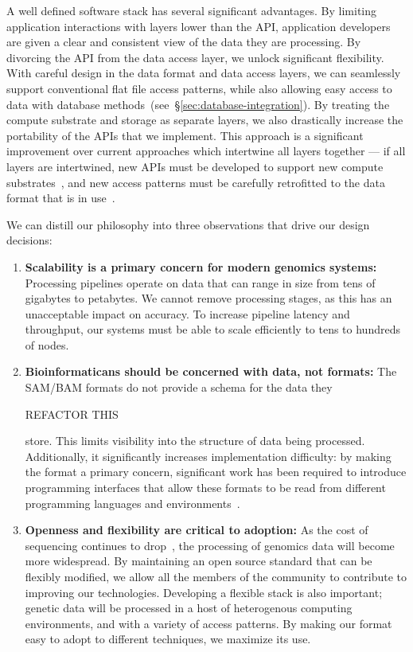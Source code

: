 \documentclass[10pt,twocolumn]{article}
\theoremstyle{plain}
\begin{document}
A well defined software stack has several significant advantages. By limiting application interactions with layers lower than the API,
application developers are given a clear and consistent view of the data they are processing. By divorcing the API from the data
access layer, we unlock significant flexibility. With careful design in the data format and data access layers, we can seamlessly
support conventional flat file access patterns, while also allowing easy access to data with database
methods~(see~\S\ref{sec:database-integration}). By treating the compute substrate and storage as separate layers, we also
drastically increase the portability of the APIs that we implement. This approach is a significant improvement over current approaches
which intertwine all layers together --- if all layers are intertwined, new APIs must be developed to support new compute
substrates~\cite{niemenmaa12}, and new access patterns must be carefully retrofitted to the data format that is in use~\cite{kozanitis13}.

We can distill our philosophy into three observations that drive our design decisions:

\begin{enumerate}
\item {\bf Scalability is a primary concern for modern genomics systems:} Processing pipelines operate on data that can range in size from
tens of gigabytes to petabytes. We cannot remove processing stages, as this has an unacceptable impact on accuracy. To increase
pipeline latency and throughput, our systems must be able to scale efficiently to tens to hundreds of nodes.
\item {\bf Bioinformaticans should be concerned with data, not formats:} The SAM/BAM formats do not provide a schema for the data they

REFACTOR THIS

store. This limits visibility into the structure of data being processed. Additionally, it significantly increases implementation difficulty: by
making the format a primary concern, significant work has been required to introduce programming interfaces that allow these formats to
be read from different programming languages and environments~\cite{li09,picard,niemenmaa12}.
\item {\bf Openness and flexibility are critical to adoption:} As the cost of sequencing continues to drop~\cite{nhgri}, the processing of genomics
data will become more widespread. By maintaining an open source standard that can be flexibly modified, we allow all the members of the
community to contribute to improving our technologies. Developing a flexible stack is also important; genetic data will be processed in a host
of heterogenous computing environments, and with a variety of access patterns. By making our format easy to adopt to different techniques, we
maximize its use.
\end{enumerate}
\end{document}
